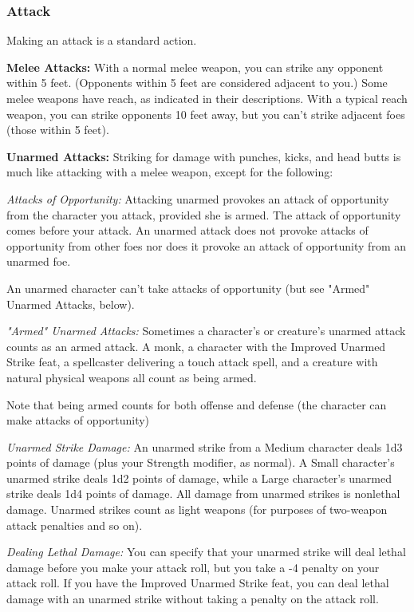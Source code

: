 \subsubsection{Attack}

Making an attack is a standard action.

\textbf{Melee Attacks:} With a normal melee weapon, you can strike any opponent 
within 5 feet. (Opponents within 5 feet are considered adjacent to you.) Some melee 
weapons have reach, as indicated in their descriptions. With a typical reach weapon, 
you can strike opponents 10 feet away, but you can't strike adjacent foes (those 
within 5 feet).

\textbf{Unarmed Attacks:} Striking for damage with punches, kicks, and head butts 
is much like attacking with a melee weapon, except for the following:

\textit{Attacks of Opportunity:} Attacking unarmed provokes an attack of opportunity 
from the character you attack, provided she is armed. The attack of opportunity 
comes before your attack. An unarmed attack does not provoke attacks of opportunity 
from other foes nor does it provoke an attack of opportunity from an unarmed foe.

An unarmed character can't take attacks of opportunity (but see "Armed" Unarmed 
Attacks, below).

\textit{"Armed" Unarmed Attacks:} Sometimes a character's or creature's unarmed 
attack counts as an armed attack. A monk, a character with the Improved Unarmed 
Strike feat, a spellcaster delivering a touch attack spell, and a creature with 
natural physical weapons all count as being armed.

Note that being armed counts for both offense and defense (the character can make 
attacks of opportunity)

\textit{Unarmed Strike Damage:} An unarmed strike from a Medium character deals 
1d3 points of damage (plus your Strength modifier, as normal). A Small character's 
unarmed strike deals 1d2 points of damage, while a Large character's unarmed strike 
deals 1d4 points of damage. All damage from unarmed strikes is nonlethal damage. 
Unarmed strikes count as light weapons (for purposes of two-weapon attack penalties 
and so on).

\textit{Dealing Lethal Damage:} You can specify that your unarmed strike will deal 
lethal damage before you make your attack roll, but you take a -4 penalty on your 
attack roll. If you have the Improved Unarmed Strike feat, you can deal lethal 
damage with an unarmed strike without taking a penalty on the attack roll.

